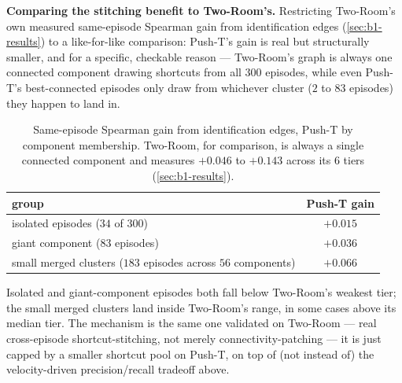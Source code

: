 \documentclass[11pt]{article}
\begin{document}
\textbf{Comparing the stitching benefit to Two-Room's.} Restricting Two-Room's own measured
same-episode Spearman gain from identification edges (\cref{sec:b1-results}) to a like-for-like
comparison: Push-T's gain is real but structurally smaller, and for a specific, checkable reason
--- Two-Room's graph is always one connected component drawing shortcuts from all $300$ episodes,
while even Push-T's best-connected episodes only draw from whichever cluster ($2$ to $83$
episodes) they happen to land in.

\begin{table}[h]
\centering
\small
\caption{Same-episode Spearman gain from identification edges, Push-T by component membership.
Two-Room, for comparison, is always a single connected component and measures $+0.046$ to
$+0.143$ across its 6 tiers (\cref{sec:b1-results}).}
\begin{tabular}{lc}
\toprule
group & Push-T gain \\
\midrule
isolated episodes ($34$ of $300$) & $+0.015$ \\
giant component ($83$ episodes) & $+0.036$ \\
small merged clusters ($183$ episodes across $56$ components) & $+0.066$ \\
\bottomrule
\end{tabular}
\end{table}

Isolated and giant-component episodes both fall below Two-Room's weakest tier; the small merged
clusters land inside Two-Room's range, in some cases above its median tier. The mechanism is the
same one validated on Two-Room --- real cross-episode shortcut-stitching, not merely
connectivity-patching --- it is just capped by a smaller shortcut pool on Push-T, on top of (not
instead of) the velocity-driven precision/recall tradeoff above.
\end{document}
